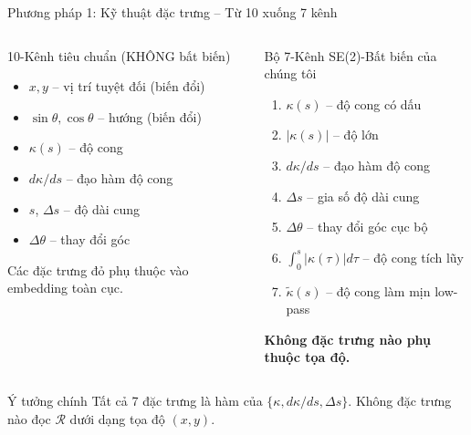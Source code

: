 \documentclass[aspectratio=169,10pt]{beamer}
\begin{document}
\begin{frame}{Phương pháp 1: Kỹ thuật đặc trưng -- Từ 10 xuống 7 kênh}
\begin{columns}[T]
\begin{alertblock}{10-Kênh tiêu chuẩn (KHÔNG bất biến)}
\scriptsize
\begin{itemize}
  \item $x, y$ -- vị trí tuyệt đối \alert{(biến đổi)}
  \item $\sin\theta, \cos\theta$ -- hướng \alert{(biến đổi)}
  \item $\kappa(s)$ -- độ cong
  \item $d\kappa/ds$ -- đạo hàm độ cong
  \item $s$, $\Delta s$ -- độ dài cung
  \item $\Delta\theta$ -- thay đổi góc
\end{itemize}
\vfill
\alert{Các đặc trưng đỏ phụ thuộc vào embedding toàn cục.}
\end{alertblock}

\begin{block}{Bộ 7-Kênh SE(2)-Bất biến của chúng tôi}
\scriptsize
\begin{enumerate}
  \item $\kappa(s)$ -- độ cong có dấu
  \item $|\kappa(s)|$ -- độ lớn
  \item $d\kappa/ds$ -- đạo hàm độ cong
  \item $\Delta s$ -- gia số độ dài cung
  \item $\Delta\theta$ -- thay đổi góc cục bộ
  \item $\int_0^s |\kappa(\tau)| d\tau$ -- độ cong tích lũy
  \item $\tilde{\kappa}(s)$ -- độ cong làm mịn low-pass
\end{enumerate}
\vfill
\textbf{Không đặc trưng nào phụ thuộc tọa độ.}
\end{block}
\end{columns}

\vspace{0.5em}
\begin{block}{Ý tưởng chính}
Tất cả 7 đặc trưng là hàm của $\{\kappa, d\kappa/ds, \Delta s\}$. \alert{Không đặc trưng nào đọc $\mathcal{R}$ dưới dạng tọa độ $(x, y)$.}
\end{block}
\end{frame}
\end{document}

